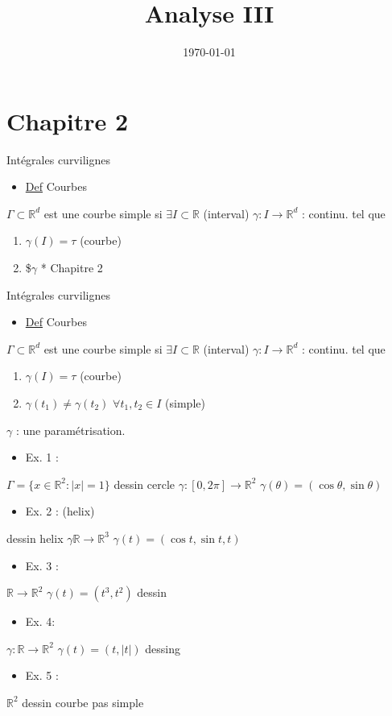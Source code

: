 \documentclass[11pt]{article}
\date{\today}
\title{Analyse III}
\begin{document}
\maketitle
\tableofcontents


\section{Chapitre 2}
\label{sec:orgheadline1}
Intégrales curvilignes

\begin{itemize}
\item \uline{Def} Courbes
\end{itemize}
\(\Gamma \subset \mathbb{R}^d\) est une courbe simple si \(\exists I \subset \mathbb{R}\)  (interval) \(\gamma: I \rightarrow \mathbb{R}^d\) : continu. tel que
\begin{enumerate}
\item \(\gamma (I) = \tau\) (courbe)
\item \$\(\gamma\) * Chapitre 2
\end{enumerate}
Intégrales curvilignes

\begin{itemize}
\item \uline{Def} Courbes
\end{itemize}
\(\Gamma \subset \mathbb{R}^d\) est une courbe simple si \(\exists I \subset \mathbb{R}\)  (interval) \(\gamma: I \rightarrow \mathbb{R}^d\) : continu. tel que
\begin{enumerate}
\item \(\gamma (I) = \tau\) (courbe)
\item \(\gamma (t_1) \neq \gamma(t_2)\) \(\forall t_1,t_2 \in I\) (simple)
\end{enumerate}
\(\gamma\) : une paramétrisation.

\begin{itemize}
\item Ex. 1 :
\end{itemize}
\(\Gamma = \{ x \in \mathbb{R}^2 : |x|=1\}\)
dessin cercle \(\gamma: \left[0,2\pi\right] \rightarrow \mathbb{R}^2\) \(\gamma(\theta) = (\cos \theta, \sin \theta)\)
\begin{itemize}
\item Ex. 2 : (helix)
\end{itemize}
dessin helix \(\gamma \mathbb{R} \rightarrow \mathbb{R}^3\) \(\gamma(t) = (\cos t, \sin t,t)\)
\begin{itemize}
\item Ex. 3 :
\end{itemize}
\(\mathbb{R} \rightarrow \mathbb{R}^2\)
\(\gamma(t) = (t^3,t^2)\)
dessin
\begin{itemize}
\item Ex. 4:
\end{itemize}
\(\gamma : \mathbb{R} \rightarrow \mathbb{R}^2\)
\(\gamma(t) = (t,|t|)\)
dessing
\begin{itemize}
\item Ex. 5 :
\end{itemize}
\(\mathbb{R}^2\) dessin courbe pas simple
\end{document}
